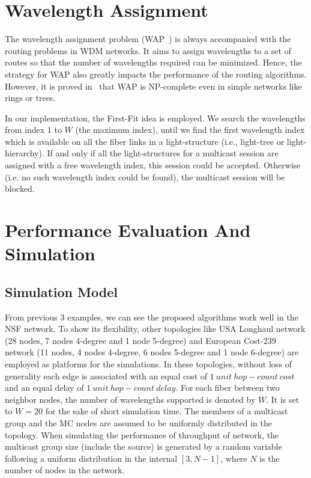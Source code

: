 \documentclass[conference]{IEEEtran}
\begin{document}
\section{Wavelength Assignment}
\label{sec: Wavelength Assignment}
The wavelength assignment problem (WAP~\cite{xhJia2001}) is always accompanied with the routing problems in WDM networks. It aims to assign wavelengths to a set of routes so that the number of wavelengths required can be minimized. Hence, the strategy for WAP also greatly impacts the performance of the routing algorithms. However, it is proved in~\cite{gWilfong1998} that WAP is NP-complete even in simple networks like rings or trees.

In our implementation, the First-Fit idea is employed. We search the wavelengths from index $1$ to $W$ (the maximum index), until we find the first wavelength index which is available on all the fiber links in a light-structure (i.e., light-tree or light-hierarchy). If and only if all the light-structures for a multicast session are assigned with a free wavelength index, this session could be accepted. Otherwise (i.e. no such wavelength index could be found), the multicast session will be blocked.

\section{Performance Evaluation And Simulation}
\label{sec: Performance Evaluation And Simulation}
\subsection{Simulation Model}
\label{subsec: Simulation Model}
From previous 3 examples, we can see the proposed algorithms work well in the NSF network. To show its flexibility, other topologies like USA Longhaul network (28 nodes, 7 nodes 4-degree and 1 node 5-degree) and European Cost-239 network (11 nodes, 4 nodes 4-degree, 6 nodes 5-degree and 1 node 6-degree) are employed as platforms for the simulations. In these topologies, without loss of generality each edge is associated with an equal cost of $1~unit~ hop-count~cost$ and an equal delay of $1~unit~ hop-count~delay$. For each fiber between two neighbor nodes, the number of wavelengths supported is denoted by $W$. It is set to $W = 20$ for the sake of short simulation time. The members of a multicast group and the MC nodes are assumed to be uniformly distributed in the topology. When simulating the performance of throughput of network, the multicast group size (include the source) is generated by a random variable following a uniform distribution in the internal $[3, N-1]$, where $N$ is the number of nodes in the network.
\end{document}
